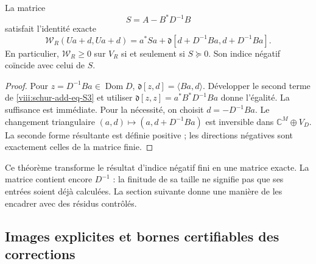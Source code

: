 \begin{theorem}
\label{viii:schur-add-schur-exacto}
La matrice
\begin{equation}
S=A-B^*D^{-1}B
\label{viii:schur-add-eq-S2}
\end{equation}
satisfait l'identité exacte
\begin{equation}
\boxed{\mathscr W_R(Ua+d,Ua+d)
=a^*Sa+
\mathfrak d[d+D^{-1}Ba,d+D^{-1}Ba].}
\label{viii:schur-add-eq-S3}
\end{equation}
En particulier, \(\mathscr W_R\geq0\) sur \(V_R\) si et seulement si \(S\succeq0\). Son indice négatif coïncide avec celui de \(S\).
\end{theorem}
\begin{proof} Pour \(z=D^{-1}Ba\in\operatorname{Dom}D\),
\(\mathfrak d[z,d]=\langle Ba,d\rangle\). Développer le second terme
de \eqref{viii:schur-add-eq-S3} et utiliser \(\mathfrak d[z,z]=a^*B^*D^{-1}Ba\) donne l'égalité.
La suffisance est immédiate. Pour la nécessité, on choisit
\(d=-D^{-1}Ba\). Le changement triangulaire \((a,d)\mapsto(a,d+D^{-1}Ba)\)
est inversible dans \(\mathbb C^M\oplus V_D\). La seconde forme résultante
est définie positive ; les directions négatives sont exactement celles de
la matrice finie.
\end{proof}

Ce théorème transforme le résultat d'indice négatif fini en une matrice exacte. La matrice contient encore \(D^{-1}\) : la finitude de sa taille ne
signifie pas que ses entrées soient déjà calculées. La section suivante
donne une manière de les encadrer avec des résidus contrôlés.

\subsection{Images explicites et bornes certifiables des corrections}
\label{viii:schur-add-sub-148}

